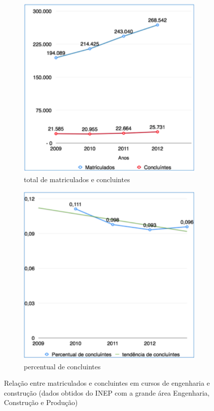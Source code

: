 \begin{figure}
	\begin{subfigure}{.5\textwidth}
  		\centering
  		\includegraphics[width=.9\linewidth]{figuras/matriculados1.eps}
  		\caption{total de matriculados e concluintes}
  		\label{fig:sub1}
	\end{subfigure}%
	\begin{subfigure}{.5\textwidth}
  		\centering
  		\includegraphics[width=.9\linewidth]{figuras/matriculados2.eps}
  		\caption{percentual de concluintes}
  		\label{fig:sub2}
	\end{subfigure}
	\caption{Relação entre matriculados e concluintes em cursos de engenharia e construção
	(dados obtidos do INEP com a grande área Engenharia, Construção e Produção)}
	\label{figura:matriculados}
\end{figure}

